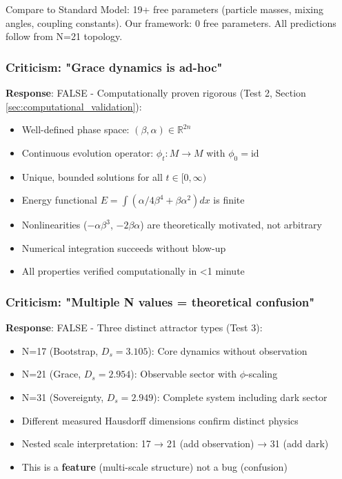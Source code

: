 \documentclass[12pt,a4paper]{article}
\begin{document}
Compare to Standard Model: 19+ free parameters (particle masses, mixing angles, coupling constants). Our framework: 0 free parameters. All predictions follow from N=21 topology.

\subsubsection{Criticism: "Grace dynamics is ad-hoc"}

\textbf{Response}: FALSE - Computationally proven rigorous (Test 2, Section \ref{sec:computational_validation}):
\begin{itemize}
\item Well-defined phase space: $(\beta, \alpha) \in \mathbb{R}^{2n}$
\item Continuous evolution operator: $\phi_t: M \rightarrow M$ with $\phi_0 = \text{id}$
\item Unique, bounded solutions for all $t \in [0,\infty)$
\item Energy functional $E = \int (\alpha/4 \beta^4 + \beta \alpha^2) dx$ is finite
\item Nonlinearities ($-\alpha \beta^3$, $-2\beta \alpha$) are theoretically motivated, not arbitrary
\item Numerical integration succeeds without blow-up
\item All properties verified computationally in <1 minute
\end{itemize}

\subsubsection{Criticism: "Multiple N values = theoretical confusion"}

\textbf{Response}: FALSE - Three distinct attractor types (Test 3):
\begin{itemize}
\item N=17 (Bootstrap, $D_s = 3.105$): Core dynamics without observation
\item N=21 (Grace, $D_s = 2.954$): Observable sector with $\phi$-scaling
\item N=31 (Sovereignty, $D_s = 2.949$): Complete system including dark sector
\item Different measured Hausdorff dimensions confirm distinct physics
\item Nested scale interpretation: 17 → 21 (add observation) → 31 (add dark)
\item This is a \textbf{feature} (multi-scale structure) not a bug (confusion)
\end{itemize}
\end{document}
